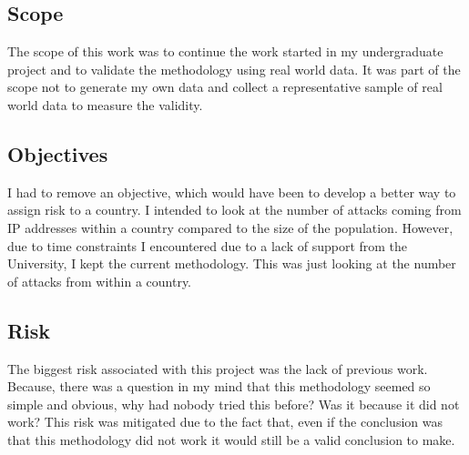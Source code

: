 \subsection{Scope}

The scope of this work was to continue the work started in my undergraduate project and to validate the methodology using real world data. It was part of the scope not to generate my own data and collect a representative sample of real world data to measure the validity. 


\subsection{Objectives}

I had to remove an objective, which would have been to develop a better way to assign risk to a country. I intended to look at the number of attacks coming from IP addresses within a country compared to the size of the population. However, due to time constraints I encountered due to a lack of support from the University, I kept the current methodology. This was just looking at the number of attacks from within a country.

\subsection{Risk}

The biggest risk associated with this project was the lack of previous work. Because, there was a question in my mind that this methodology seemed so simple and obvious, why had nobody tried this before? Was it because it did not work? This risk was mitigated due to the fact that, even if the conclusion was that this methodology did not work it would still be a valid conclusion to make.